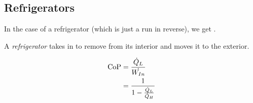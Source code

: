 \subsection{Refrigerators}\label{subsec:Refrigerators}
In the case of a refrigerator (which is just a  run in reverse), we get .

\begin{definition}[Refrigerator]\label{def:Refrigerator}
  A \emph{refrigerator} takes  in to remove  from its interior and moves it to the exterior.
\end{definition}

\begin{equation}\label{eq:Coefficient_of_Performance-Refrigerator}
  \begin{aligned}
    \text{CoP} &= \frac{\dot{Q}_{L}}{\dot{W_{In}}} \\
    &= \frac{1}{1 - \frac{\dot{Q}_{L}}{\dot{Q}_{H}}}
  \end{aligned}
\end{equation}

